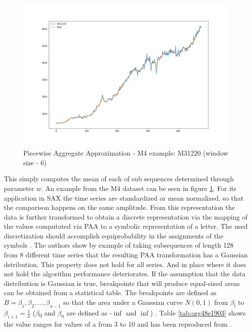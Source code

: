 \documentclass[phd,black, hidelinks]{PrincetonThesis}
\begin{document}
\begin{figure}[htbp]
\centering
\includegraphics[width=.9\linewidth]{./img/paa_example.png}
\caption{\label{fig:org2685122}Piecewise Aggregate Approximation - M4 example: M31220 (window size - 6)}
\end{figure}

This simply computes the mean of each of sub sequences determined through parameter \(w\). An example from the M4 dataset can be seen in figure \ref{fig:org2685122}. For its application in SAX the time series are standardized or mean normalized, so that the comparison happens on the same amplitude. From this representation the data is further transformed to obtain a discrete representation via the mapping of the values computated via PAA to a symbolic representation of a letter. The used discretization should accomplish equiprobability in the assignments of the symbols \cite{Lin_2007}. The authors show by example of taking subsequences of length 128 from 8 different time series that the resulting PAA transformation has a Gaussian dstribution. This property does not hold for all series. And in place where it does not hold the algorithm performance deteriorates. If the assumption that the data distribution is Gaussian is true, breakpoints that will produce equal-sized areas can be obtained from a statistical table. The breakpoints are defined as \(B = \beta_1, \beta_2, \dots, \beta_{a-1}\) so that the area under a Gaussian curve \(N(0,1)\) from \(\beta\)\textsubscript{i} to \(\beta_{i+1}= \frac{1}{a}\)  (\(\beta\)\textsubscript{0} and \(\beta\)\textsubscript{a} are defined as -\(\inf\) and \(\inf\)) \cite{Lin_2007}. Table \ref{tab:org48e1903} shows the value ranges for values of a from 3 to 10 and has been reproduced from \cite{Lin_2007}.
\end{document}
